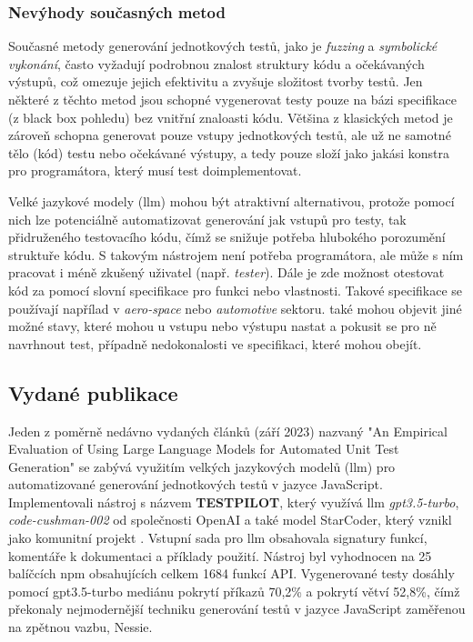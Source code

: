 \documentclass[czech, ma, kiv, he, iso690numb, pdf, viewonly]{fasthesis}
\begin{document}
        \subsubsection{Nevýhody současných metod}
        Současné metody generování jednotkových testů, jako je \textit{fuzzing} a \textit{symbolické vykonání}, často vyžadují podrobnou znalost struktury kódu a očekávaných výstupů, což omezuje jejich efektivitu a zvyšuje složitost tvorby testů. Jen některé z těchto metod jsou schopné vygenerovat testy pouze na bázi specifikace (z black box pohledu) bez vnitřní znaloasti kódu. Většina z klasických metod je zároveň schopna generovat pouze vstupy jednotkových testů, ale už ne samotné tělo (kód) testu nebo očekávané výstupy, a tedy pouze složí jako jakási konstra pro programátora, který musí test doimplementovat.

        Velké jazykové modely (\gls{llm}) mohou být atraktivní alternativou, protože pomocí nich lze potenciálně automatizovat generování jak vstupů pro testy, tak přidruženého testovacího kódu, čímž se snižuje potřeba hlubokého porozumění struktuře kódu. S takovým nástrojem není potřeba programátora, ale může s ním pracovat i méně zkušený uživatel (např. \textit{tester}). Dále je zde možnost otestovat kód za pomocí slovní specifikace pro funkci nebo vlastnosti. Takové specifikace se používají napřílad v \textit{aero-space} nebo \textit{automotive} sektoru. \cite{KuglerMaag2024SysReqAnalysis}  také mohou objevit jiné možné stavy, které mohou u vstupu nebo výstupu nastat a pokusit se pro ně navrhnout test, případně nedokonalosti ve specifikaci, které mohou obejít.

    \subsection{Vydané publikace}
    Jeden z poměrně nedávno vydaných článků (září 2023) nazvaný "An Empirical Evaluation of Using Large Language Models for Automated Unit Test Generation" \cite{schafer2023empirical} se zabývá využitím velkých jazykových modelů (\gls{llm}) pro automatizované generování jednotkových testů v jazyce JavaScript. Implementovali nástroj s názvem \textbf{TESTPILOT}, který využívá \gls{llm} \textit{gpt3.5-turbo}, \textit{code-cushman-002} od společnosti OpenAI a  také model StarCoder, který vznikl jako komunitní projekt \cite{StarCoder2023}. Vstupní sada pro \gls{llm} obsahovala signatury funkcí, komentáře k dokumentaci a příklady použití. Nástroj byl vyhodnocen na 25 balíčcích npm obsahujících celkem 1684 funkcí API. Vygenerované testy dosáhly pomocí gpt3.5-turbo mediánu pokrytí příkazů 70,2\% a pokrytí větví 52,8\%, čímž překonaly nejmodernější techniku generování testů v jazyce JavaScript zaměřenou na zpětnou vazbu, Nessie.
\end{document}
